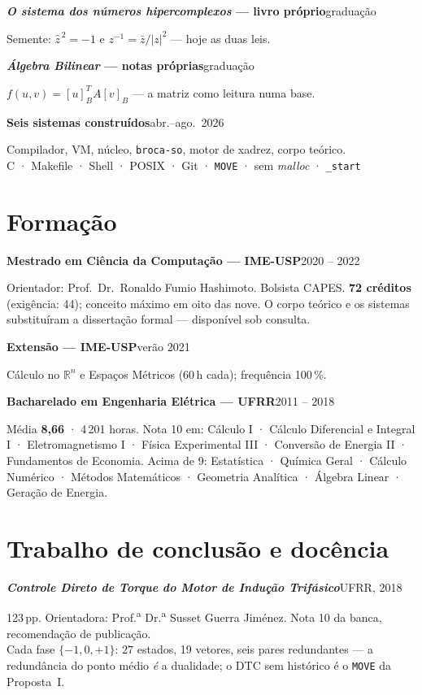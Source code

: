 \documentclass[11pt,a4paper]{article}
\newcommand{\lin}[2]{\noindent\textbf{#1}\hfill{\color{cinza}\small #2}\par}
\begin{document}
\smallskip
\lin{\emph{O sistema dos números hipercomplexos} --- livro próprio}{graduação}
Semente: $\hat z^{\,2}=-1$ e $z^{-1}=\bar z/|z|^2$ --- hoje as duas leis.

\smallskip
\lin{\emph{Álgebra Bilinear} --- notas próprias}{graduação}
$f(u,v)=[u]^{T}_{B}A[v]_{B}$ --- a matriz como leitura numa base.

\smallskip
\lin{Seis sistemas construídos}{abr.--ago.\ 2026}
Compilador, VM, núcleo, \texttt{broca-so}, motor de xadrez, corpo teórico.
\\[1pt]
{\small\color{cinza}C · Makefile · Shell · POSIX · Git · \texttt{MOVE} · sem \emph{malloc}
· \texttt{\_start}}

\section*{Formação}

\lin{Mestrado em Ciência da Computação --- IME-USP}{2020 -- 2022}
Orientador: Prof.\ Dr.\ Ronaldo Fumio Hashimoto. Bolsista CAPES.
\textbf{72 créditos} (exigência: 44); conceito máximo em oito das nove.
O corpo teórico e os sistemas substituíram a dissertação formal --- disponível sob consulta.

\smallskip
{}

\smallskip
\lin{Extensão --- IME-USP}{verão 2021}
Cálculo no $\mathbb{R}^n$ e Espaços Métricos (60\,h cada); frequência 100\,\%.

\smallskip
\lin{Bacharelado em Engenharia Elétrica --- UFRR}{2011 -- 2018}
Média \textbf{8{,}66} · 4\,201 horas.
Nota 10 em: Cálculo I · Cálculo Diferencial e Integral I · Eletromagnetismo I ·
Física Experimental III · Conversão de Energia II · Fundamentos de Economia.
Acima de 9: Estatística · Química Geral · Cálculo Numérico · Métodos Matemáticos ·
Geometria Analítica · Álgebra Linear · Geração de Energia.

\section*{Trabalho de conclusão e docência}

\lin{\emph{Controle Direto de Torque do Motor de Indução Trifásico}}{UFRR, 2018}
123\,pp. Orientadora: Prof.\textsuperscript{a} Dr.\textsuperscript{a} Susset Guerra Jiménez.
Nota 10 da banca, recomendação de publicação.
\\[1pt]
{\small Cada fase $\{-1,0,+1\}$: $27$ estados, 19 vetores, seis pares redundantes --- a
redundância do ponto médio \emph{é} a dualidade; o DTC sem histórico é o \texttt{MOVE}
da Proposta~I.}
\end{document}
